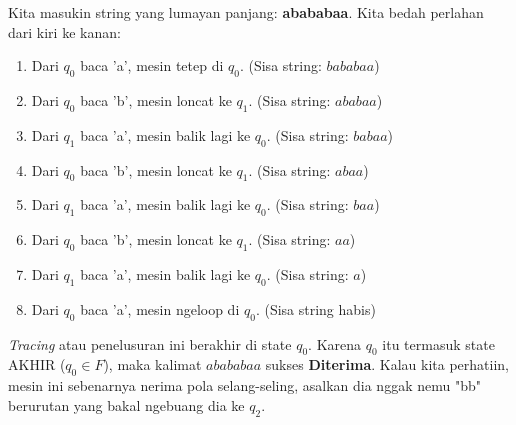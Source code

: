 \documentclass[12pt,a4paper]{article}
\begin{document}
Kita masukin string yang lumayan panjang: \textbf{abababaa}. Kita bedah perlahan dari kiri ke kanan:
\begin{enumerate}
    \item Dari $q_0$ baca 'a', mesin tetep di $q_0$. (Sisa string: $bababaa$)
    \item Dari $q_0$ baca 'b', mesin loncat ke $q_1$. (Sisa string: $ababaa$)
    \item Dari $q_1$ baca 'a', mesin balik lagi ke $q_0$. (Sisa string: $babaa$)
    \item Dari $q_0$ baca 'b', mesin loncat ke $q_1$. (Sisa string: $abaa$)
    \item Dari $q_1$ baca 'a', mesin balik lagi ke $q_0$. (Sisa string: $baa$)
    \item Dari $q_0$ baca 'b', mesin loncat ke $q_1$. (Sisa string: $aa$)
    \item Dari $q_1$ baca 'a', mesin balik lagi ke $q_0$. (Sisa string: $a$)
    \item Dari $q_0$ baca 'a', mesin ngeloop di $q_0$. (Sisa string habis)
\end{enumerate}
\textit{Tracing} atau penelusuran ini berakhir di state $q_0$. Karena $q_0$ itu termasuk state AKHIR ($q_0 \in F$), maka kalimat $abababaa$ sukses \textbf{Diterima}.
Kalau kita perhatiin, mesin ini sebenarnya nerima pola selang-seling, asalkan dia nggak nemu "bb" berurutan yang bakal ngebuang dia ke $q_2$.
\end{document}
